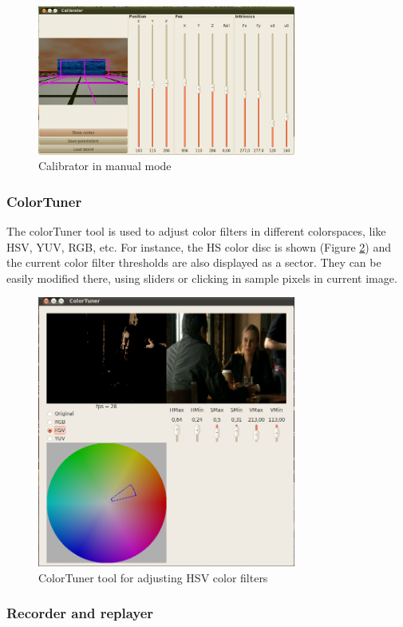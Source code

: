 \documentclass[twocolumn]{svjour3}          %
\begin{document}
\begin{figure}[h!]
  \includegraphics[width=8.5cm]{figs/calibratorGUI.png}
\caption{Calibrator in manual mode}
\label{fig:calibrator}
\end{figure}

\subsubsection{ColorTuner}

The colorTuner tool is used to adjust color filters in different colorspaces, like HSV, YUV, RGB, etc. For instance, the HS color disc is shown (Figure \ref{fig:colortuner}) and the current color filter thresholds are also displayed as a sector. They can be easily modified there, using sliders or clicking in sample pixels in current image.

\begin{figure}[h!]
  \includegraphics[width=8.5cm]{figs/colorTunerHSV.png}
\caption{ColorTuner tool for adjusting HSV color filters}
\label{fig:colortuner}
\end{figure}


\subsubsection{Recorder and replayer}
\end{document}
